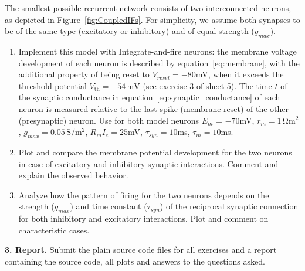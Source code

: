 \documentclass[12pt]{article}
\begin{document}
    The smallest possible recurrent network consists of two interconnected
    neurons, as depicted in Figure~\ref{fig:CoupledIFs}. For simplicity, we
    assume both synapses to be of the same type (excitatory or inhibitory) and
    of equal strength ($g_{max}$).
    
    \begin{enumerate}
     \item Implement this model with Integrate-and-fire neurons: the membrane
    voltage development of each neuron is described
    by equation~\ref{eq:membrane}, with the additional property of being reset
    to $V_{reset}=-80$mV, when it exceeds the threshold potential
    $V_\mathrm{th}=-54\,\mathrm{mV}$ (see exercise 3 of sheet 5). The time $t$
    of the synaptic conductance in equation~\ref{eq:synaptic_conductance} of
    each neuron is measured relative to the last spike (membrane reset) of
    the other (presynaptic) neuron. Use for both model neurons $E_m$ = $-70$mV,
    $r_m= 1\,\mathrm{\Omega m^2}$, $g_{max} = 0.05\,\mathrm{S/m^2}$, $R_m I_e
    = 25$mV, $\tau_{syn} = 10$ms, $\tau_m=10$ms.
    \item Plot and compare the membrane potential development for the two
          neurons in case of excitatory and inhibitory synaptic interactions.
          Comment and explain the observed behavior.
    \item Analyze how the pattern of firing for the two neurons
          depends on the strength ($g_{max}$) and time
          constant ($\tau_{syn}$) of the reciprocal synaptic connection for both
          inhibitory and excitatory interactions. Plot and comment
          on characteristic cases.
    \end{enumerate}

 {\bf 3. Report.} Submit the plain source code files for all exercises
         and a report containing the source code, all plots and answers to the
         questions asked.
\end{document}
